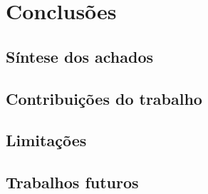 \chapter{Conclusões}


\section{Síntese dos achados}

\section{Contribuições do trabalho}

\section{Limitações}

\section{Trabalhos futuros}
